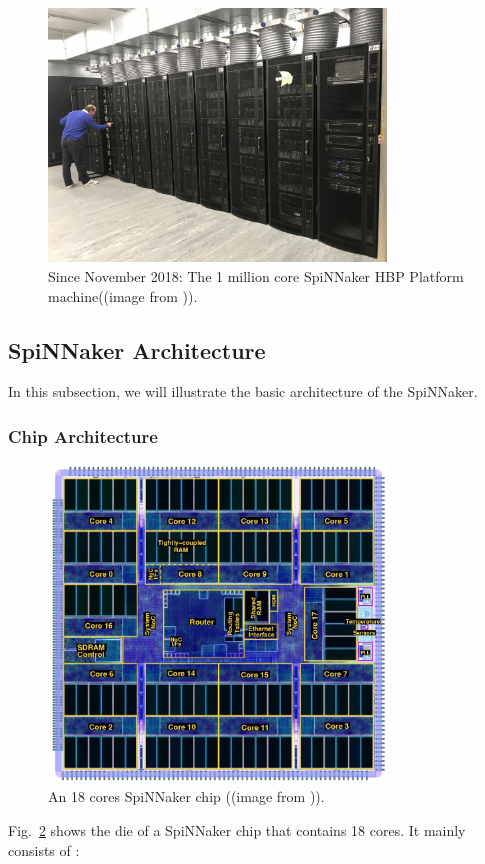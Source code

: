 \begin{figure}[!tb]
   \centering
       \includegraphics[width=0.8\textwidth]{figures/super_machine.jpg}
       \caption{Since November 2018: The 1 million core SpiNNaker HBP Platform machine((image from \cite{super_machine})).}
       \label{fig:super_machine}
\end{figure}



\subsection{SpiNNaker Architecture} \label{sec:sa}
In this subsection, we will illustrate the basic architecture of the SpiNNaker.
\subsubsection{Chip Architecture} \label{sec:ca}
\begin{figure}[!tb]
   \centering
       \includegraphics[width=0.8\textwidth]{figures/spinn_labeled_bw.png}
       \caption{An 18 cores SpiNNaker chip ((image from \cite{spinn-core})).}
       \label{fig:spinn-core}
\end{figure}
Fig.~\ref{fig:spinn-core} shows the die of a SpiNNaker chip that contains 18 cores. It mainly consists of \cite{furber2012overview}:

